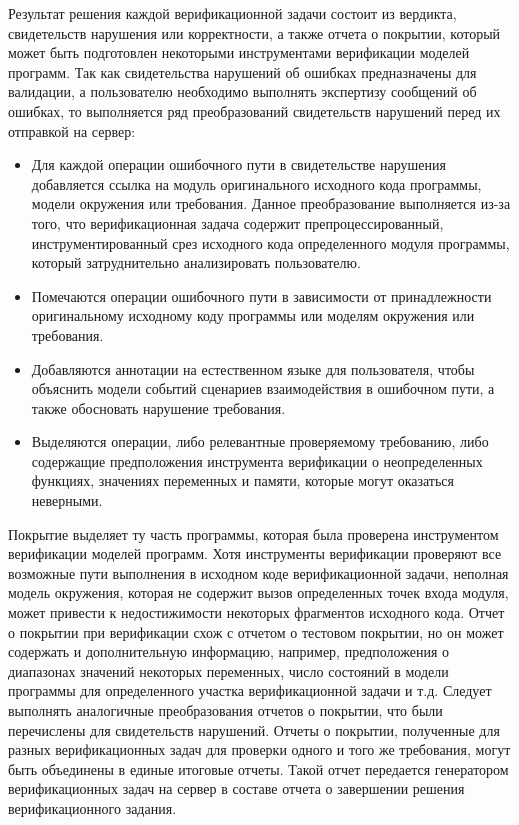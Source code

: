 Результат решения каждой верификационной задачи состоит из вердикта, свидетельств нарушения или корректности, а также отчета о покрытии, который может быть подготовлен некоторыми инструментами верификации моделей программ.
Так как свидетельства нарушений об ошибках предназначены для валидации, а пользователю необходимо выполнять экспертизу сообщений об ошибках, то выполняется ряд преобразований свидетельств нарушений перед их отправкой на сервер:
\begin{itemize}
    \item Для каждой операции ошибочного пути в свидетельстве нарушения добавляется ссылка на модуль оригинального исходного кода программы, модели окружения или требования.
    Данное преобразование выполняется из-за того, что верификационная задача содержит препроцессированный, инструментированный срез исходного кода определенного модуля программы, который затруднительно анализировать пользователю.
    \item Помечаются операции ошибочного пути в зависимости от принадлежности оригинальному исходному коду программы или моделям окружения или требования.
    \item Добавляются аннотации на естественном языке для пользователя, чтобы объяснить модели событий сценариев взаимодействия в ошибочном пути, а также обосновать нарушение требования.
    \item Выделяются операции, либо релевантные проверяемому требованию, либо содержащие предположения инструмента верификации о неопределенных функциях, значениях переменных и памяти, которые могут оказаться неверными.
\end{itemize}

Покрытие выделяет ту часть программы, которая была проверена инструментом верификации моделей программ.
Хотя инструменты верификации проверяют все возможные пути выполнения в исходном коде верификационной задачи, неполная модель окружения, которая не содержит вызов определенных точек входа модуля, может привести к недостижимости некоторых фрагментов исходного кода.
Отчет о покрытии при верификации схож с отчетом о тестовом покрытии, но он может содержать и дополнительную информацию, например, предположения о диапазонах значений некоторых переменных, число состояний в модели программы для определенного участка верификационной задачи и т.д.
Следует выполнять аналогичные преобразования отчетов о покрытии, что были перечислены для свидетельств нарушений.
Отчеты о покрытии, полученные для разных верификационных задач для проверки одного и того же требования, могут быть объединены в единые итоговые отчеты.
Такой отчет передается генератором верификационных задач на сервер в составе отчета о завершении решения верификационного задания.

